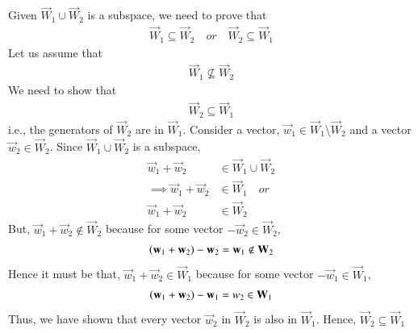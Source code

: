 Given $\vec{W}_1 \cup \vec{W}_2$ is a subspace, we need to prove that 
\begin{align}
\vec{W}_1 \subseteq \vec{W}_2  \quad or\quad  \vec{W}_2 \subseteq \vec{W}_1
\end{align}
 Let us assume that 
 \begin{align}
 \vec{W}_1 \not\subseteq \vec{W}_2
 \end{align}
  We need to show that 
  \begin{align}
  \vec{W}_2 \subseteq \vec{W}_1
  \end{align}
  i.e.,  the generators of $\vec{W}_2$ are in $\vec{W}_1$. Consider a vector, $\vec{w}_1 \in \vec{W}_1$\textbackslash $\vec{W}_2$ and a vector $\vec{w}_2 \in \vec{W}_2$. Since $\vec{W}_1 \cup \vec{W}_2$ is a subspace,
\begin{align}
\vec{w}_1 + \vec{w}_2 &\in \vec{W}_1 \cup \vec{W}_2\\
\implies \vec{w}_1 + \vec{w}_2 &\in \vec{W}_1 \quad or\\
 \vec{w}_1 + \vec{w}_2 &\in \vec{W}_2
\end{align}
But, $\vec{w}_1 + \vec{w}_2 \not \in \vec{W}_2$ because for some vector $-\vec{w}_2 \in \vec{W}_2$,
\begin{align}
	 \left(\mathbf{w}_1 + \mathbf{w}_2\right) - \mathbf{w}_2 = \mathbf{w}_1 \not\in \mathbf{W}_2
\end{align}
Hence it must be that, $\vec{w}_1 + \vec{w}_2 \in \vec{W}_1$ because for some vector $-\vec{w}_1 \in \vec{W}_1$,
\begin{align}
	\left(\mathbf{w}_1 + \mathbf{w}_2\right)- \mathbf{w}_1 = w_2 \in \mathbf{W}_1
\end{align}
Thus, we have shown that every vector $\vec{w}_2$ in $\vec{W}_2$ is also in $\vec{W}_1$. Hence, $\vec{W}_2 \subseteq \vec{W}_1$
